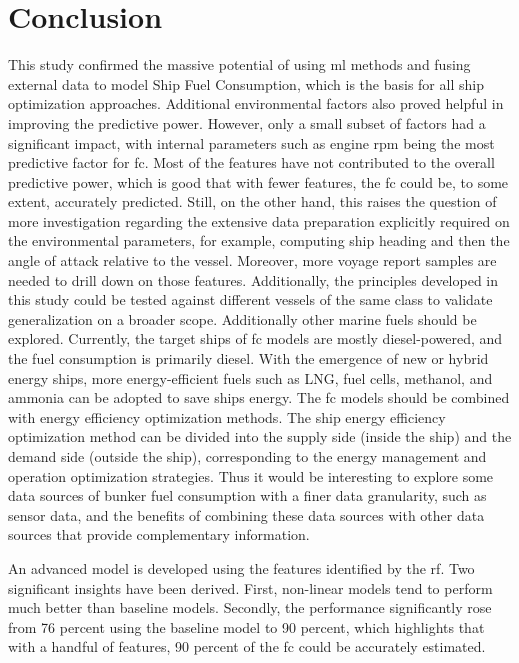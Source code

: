 \section{Conclusion}\label{sec:conclusion}

This study confirmed the massive potential of using \ac{ml} methods and fusing external data to model Ship Fuel Consumption, which is the basis for all ship optimization approaches. Additional environmental factors also proved helpful in improving the predictive power. However, only a small subset of factors had a significant impact, with internal parameters such as engine \ac{rpm} being the most predictive factor for \ac{fc}. 
Most of the features have not contributed to the overall predictive power, which is good that with fewer features, the \ac{fc} could be, to some extent, accurately predicted. Still, on the other hand, this raises the question of more investigation regarding the extensive data preparation explicitly required on the environmental parameters, for example, computing ship heading and then the angle of attack relative to the vessel. Moreover, more voyage report samples are needed to drill down on those features. Additionally, the principles developed in this study could be tested against different vessels of the same class to validate generalization on a broader scope. 
Additionally other marine fuels should be explored. Currently, the target ships of \ac{fc} models are mostly diesel-powered, and the fuel consumption is primarily diesel. With the emergence of new or hybrid energy ships, more energy-efficient fuels such as LNG, fuel cells, methanol, and ammonia can be adopted to save ships energy.
The \ac{fc} models should be combined with energy efficiency optimization methods. The ship energy efficiency optimization method can be divided into the supply side (inside the ship) and the demand side (outside the ship), corresponding to the energy management and operation optimization strategies. Thus it would be interesting to explore some data sources of bunker fuel consumption with a finer data granularity, such as sensor data, and the benefits of combining these data sources with other data sources that provide complementary information.

An advanced model is developed using the features identified by the \ac{rf}. Two significant insights have been derived. First, non-linear models tend to perform much better than baseline models. Secondly, the performance significantly rose from 76 percent using the baseline model to 90 percent, 
which highlights that with a handful of features, 90 percent of the \ac{fc} could be accurately estimated.

